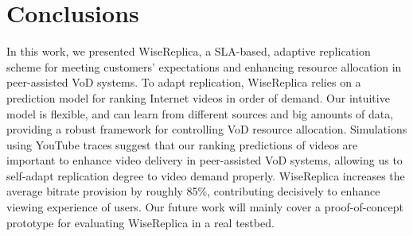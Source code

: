 \section{Conclusions}
\label{sec:conclusion}

In this work, we presented WiseReplica, a SLA-based, adaptive replication scheme for meeting customers' expectations and enhancing resource allocation in peer-assisted VoD systems. To adapt replication, WiseReplica relies on a prediction model for ranking Internet videos in order of demand. Our intuitive model is flexible, and can learn from different sources and big amounts of data, providing a robust framework for controlling VoD resource allocation. Simulations using YouTube traces suggest that our ranking predictions of videos are important to enhance video delivery in peer-assisted VoD systems, allowing us to self-adapt replication degree to video demand properly. WiseReplica increases the average bitrate provision by roughly 85\%, contributing decisively to enhance viewing experience of users. Our future work will mainly cover a proof-of-concept prototype for evaluating WiseReplica in a real testbed.

